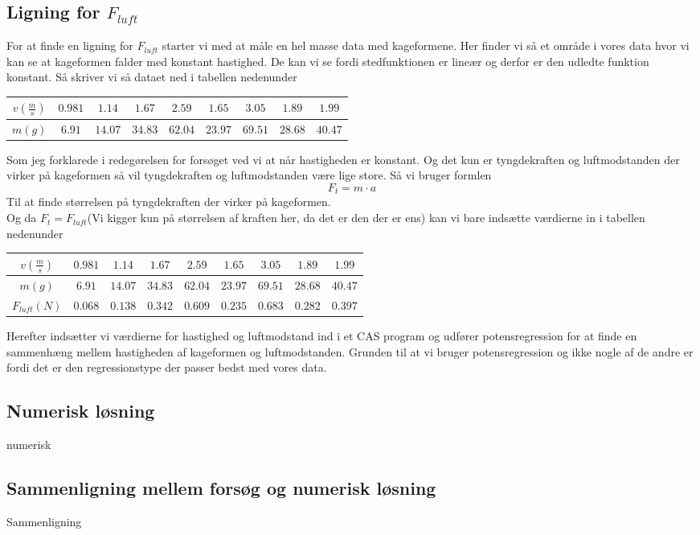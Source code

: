 \documentclass[12pt]{article}
\begin{document}
\subsection{Ligning for $F_{luft}$}
For at finde en ligning for $F_{luft}$ starter vi med at måle en hel masse data
med kageformene. Her finder vi så et område i vores data hvor vi kan se at kageformen
falder med konstant hastighed. De kan vi se fordi stedfunktionen er lineær og derfor er
den udledte funktion konstant. Så skriver vi så dataet ned i tabellen nedenunder
\begin{center}
  \begin{tabular}{| c | c | c | c | c | c | c | c | c |}
        \hline
        $v(\frac{m}{s})$ & $0.981$ & $1.14$ & $1.67$ & $2.59$ & $1.65$ & $3.05$ & $1.89$ & $1.99$ \\
        \hline
        $m(g)$ & $6.91$ & $14.07$ & $34.83$ & $62.04$ & $23.97$ & $69.51$ & $28.68$ & $40.47$ \\
        \hline
  \end{tabular}
\end{center}

Som jeg forklarede i redegørelsen for forsøget ved vi at når hastigheden er konstant. Og det kun er tyngdekraften og luftmodstanden der virker på kageformen
så vil tyngdekraften og luftmodstanden være lige store. Så vi bruger formlen
$$F_{t}=m \cdot a$$
Til at finde størrelsen på tyngdekraften der virker på kageformen. \\
Og da $F_{t}=F_{luft}$(Vi kigger kun på størrelsen af kraften her, da det er den der er ens)
kan vi bare indsætte værdierne in i tabellen nedenunder
\begin{center}
  \begin{tabular}{| c | c | c | c | c | c | c | c | c |}
        \hline
        $v(\frac{m}{s})$ & $0.981$ & $1.14$ & $1.67$ & $2.59$ & $1.65$ & $3.05$ & $1.89$ & $1.99$ \\
        \hline
        $m(g)$ & $6.91$ & $14.07$ & $34.83$ & $62.04$ & $23.97$ & $69.51$ & $28.68$ & $40.47$ \\
        \hline
        $F_{luft}(N)$ & $0.068$ & $0.138$ & $0.342$ & $0.609$ & $0.235$ & $0.683$ & $0.282$ & $0.397$ \\
        \hline
  \end{tabular}
\end{center}

Herefter indsætter vi værdierne for hastighed og luftmodstand ind i et CAS program og udfører potensregression for at finde en sammenhæng mellem
hastigheden af kageformen og luftmodstanden. Grunden til at vi bruger potensregression og ikke nogle af de andre er fordi det er den regressionstype der passer bedst med vores data.

\subsection{Numerisk løsning}
numerisk
\subsection{Sammenligning mellem forsøg og numerisk løsning}
Sammenligning
\end{document}
